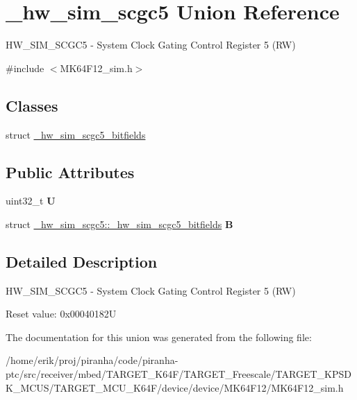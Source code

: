 \hypertarget{union__hw__sim__scgc5}{}\section{\+\_\+hw\+\_\+sim\+\_\+scgc5 Union Reference}
\label{union__hw__sim__scgc5}


H\+W\+\_\+\+S\+I\+M\+\_\+\+S\+C\+G\+C5 -\/ System Clock Gating Control Register 5 (RW)  




{\ttfamily \#include $<$M\+K64\+F12\+\_\+sim.\+h$>$}

\subsection*{Classes}
\begin{DoxyCompactItemize}
\item 
struct \hyperlink{struct__hw__sim__scgc5_1_1__hw__sim__scgc5__bitfields}{\+\_\+hw\+\_\+sim\+\_\+scgc5\+\_\+bitfields}
\end{DoxyCompactItemize}
\subsection*{Public Attributes}
\begin{DoxyCompactItemize}
\item 
uint32\+\_\+t {\bfseries U}\hypertarget{union__hw__sim__scgc5_a8109a555d5f7eb794b7529339a0c974b}{}\label{union__hw__sim__scgc5_a8109a555d5f7eb794b7529339a0c974b}

\item 
struct \hyperlink{struct__hw__sim__scgc5_1_1__hw__sim__scgc5__bitfields}{\+\_\+hw\+\_\+sim\+\_\+scgc5\+::\+\_\+hw\+\_\+sim\+\_\+scgc5\+\_\+bitfields} {\bfseries B}\hypertarget{union__hw__sim__scgc5_a33b9926e33a39b8cf814b0fdd9bb7149}{}\label{union__hw__sim__scgc5_a33b9926e33a39b8cf814b0fdd9bb7149}

\end{DoxyCompactItemize}


\subsection{Detailed Description}
H\+W\+\_\+\+S\+I\+M\+\_\+\+S\+C\+G\+C5 -\/ System Clock Gating Control Register 5 (RW) 

Reset value\+: 0x00040182U 

The documentation for this union was generated from the following file\+:\begin{DoxyCompactItemize}
\item 
/home/erik/proj/piranha/code/piranha-\/ptc/src/receiver/mbed/\+T\+A\+R\+G\+E\+T\+\_\+\+K64\+F/\+T\+A\+R\+G\+E\+T\+\_\+\+Freescale/\+T\+A\+R\+G\+E\+T\+\_\+\+K\+P\+S\+D\+K\+\_\+\+M\+C\+U\+S/\+T\+A\+R\+G\+E\+T\+\_\+\+M\+C\+U\+\_\+\+K64\+F/device/device/\+M\+K64\+F12/M\+K64\+F12\+\_\+sim.\+h\end{DoxyCompactItemize}
